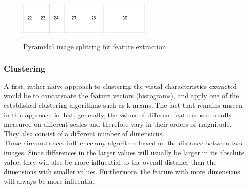 \begin{figure}[h]
\includegraphics[width=0.19\textwidth]{images/partitioning3v.pdf}
\includegraphics[width=0.19\textwidth]{images/partitioning2v.pdf}
\includegraphics[width=0.19\textwidth]{images/partitioning1v.pdf}
\caption{Pyramidal image splitting for feature extraction}
\label{fig_blackwhite}
\end{figure}


\subsubsection{Clustering}
A first, rather naive approach to clustering the visual characteristics extracted would be to concatenate the feature vectors (histograms), and apply one of the established clustering algorithms such as k-means. The fact that remains unseen in this approach is that, generally, the values of different features are usually measured on different scales and therefore vary in their orders of magnitude. They also consist of a different number of dimensions. \\
These circumstances influence any algorithm based on the distance between two images. Since differences in the larger values will usually be larger in its absolute value, they will also be more influential to the overall distance than the dimensions with smaller values. Furthermore, the feature with more dimensions will always be more influential.

